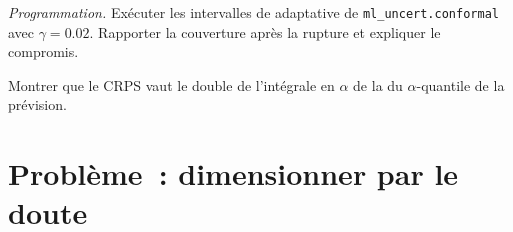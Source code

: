 \begin{exercise}[$\star\star\star$]\label{exo:ml:probabilistic-models-and-uncertainty:7}
\emph{Programmation.} Exécuter les intervalles de  adaptative de \texttt{ml\_uncert.conformal} avec $\gamma = 0.02$. Rapporter la
couverture après la rupture et expliquer le compromis.
\end{exercise}

\begin{exercise}[$\star\star\star$]\label{exo:ml:probabilistic-models-and-uncertainty:8}
Montrer que le CRPS vaut le double de l'intégrale en $\alpha$ de la  du $\alpha$-quantile de la prévision.
\end{exercise}

\section{Problème~: dimensionner par le doute}

